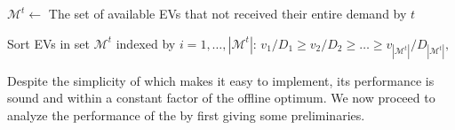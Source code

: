 \begin{algorithm}%
\footnotesize
\caption{\focs: $\forall t\in \{1,2,\dots ,T\}$}
\label{alg:focs}
\DontPrintSemicolon 



\BlankLine

$\mathcal{M}^t\leftarrow$ The set of available EVs that not received their entire demand by $t$ 

Sort EVs in set $\mathcal{M}^t$ indexed by $i=1,\dots ,|\mathcal{M}^t|$: $v_1/D_1\geq v_2/D_2\geq\dots\geq v_{|\mathcal{M}^t|}/D_{|\mathcal{M}^t|},$  \label{algline:sort}


\end{algorithm}
Despite the simplicity of \focs which makes it easy to implement, its performance is sound and within a constant factor of the offline optimum. We now proceed to analyze the performance of the \focs by first giving some preliminaries. 

